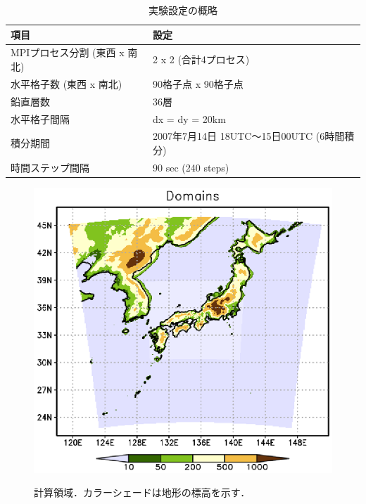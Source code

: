 \begin{table}[h]
\begin{center}
  \caption{実験設定の概略}
  \label{tab:grids}
  \begin{tabularx}{150mm}{|l|X|} \hline
    \rowcolor[gray]{0.9} 項目 & 設定 \\ \hline
    MPIプロセス分割 (東西 x 南北) & 2 x 2 (合計4プロセス) \\ \hline
    水平格子数 (東西 x 南北) & 90格子点 x 90格子点 \\ \hline
    鉛直層数                 & 36層                  \\ \hline
    水平格子間隔             & dx = dy = 20km       \\ \hline
    積分期間 & 2007年7月14日 18UTC～15日00UTC (6時間積分) \\ \hline
    時間ステップ間隔 & 90 sec (240 steps) \\ \hline
  \end{tabularx}
\end{center}
\end{table}

\begin{figure}[tb]
\begin{center}
  \includegraphics[width=0.5\hsize]{./figure/real_domain.eps}\\
  \caption{計算領域．カラーシェードは地形の標高を示す．}
  \label{fig:tutrial_real_domain}
\end{center}
\end{figure}


